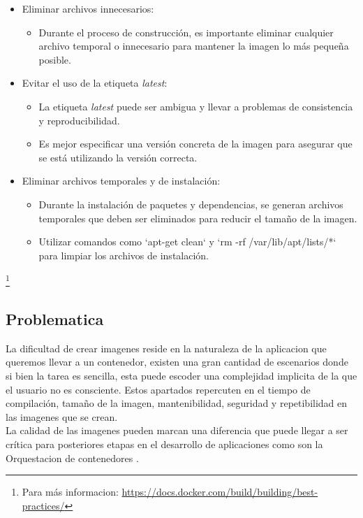\documentclass[12pt, a4paper, twoside]{article}
\begin{document}
\begin{itemize}
    \item Eliminar archivos innecesarios:
    \begin{itemize}
        \item Durante el proceso de construcción, es importante eliminar cualquier archivo temporal o innecesario para mantener la imagen lo más pequeña posible.
    \end{itemize}
    
    \item Evitar el uso de la etiqueta \textit{latest}:
    \begin{itemize}
        \item La etiqueta \textit{latest} puede ser ambigua y llevar a problemas de consistencia y reproducibilidad.
        \item Es mejor especificar una versión concreta de la imagen para asegurar que se está utilizando la versión correcta.
    \end{itemize}
    
    \item Eliminar archivos temporales y de instalación:
    \begin{itemize}
        \item Durante la instalación de paquetes y dependencias, se generan archivos temporales que deben ser eliminados para reducir el tamaño de la imagen.
        \item Utilizar comandos como `apt-get clean` y `rm -rf /var/lib/apt/lists/*` para limpiar los archivos de instalación.
    \end{itemize}
    

    
\end{itemize}
\footnote{ Para más informacion: \href{https://docs.docker.com/build/building/best-practices/}{https://docs.docker.com/build/building/best-practices/}}
\newpage 

\subsection{Problematica}
La dificultad de crear imagenes reside en la naturaleza de la aplicacion que queremos llevar a un contenedor, existen una gran cantidad de escenarios donde si bien la tarea es sencilla, esta puede escoder una complejidad implicita
de la que el usuario no es consciente. 
Estos apartados repercuten en el tiempo de compilación, tamaño de la imagen, mantenibilidad, seguridad y repetibilidad en las imagenes que se crean. \\
La calidad de las imagenes pueden marcan una diferencia que puede llegar a ser crítica para posteriores etapas en el desarrollo de aplicaciones como son la Orquestacion de contenedores \cite{ibm_container_orchestration}.
\end{document}
